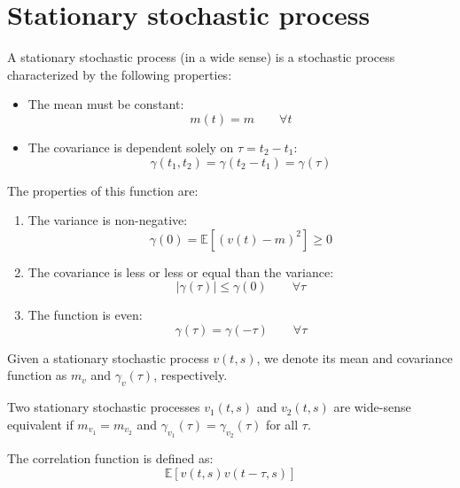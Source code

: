 \section{Stationary stochastic process}

\begin{definition}
    A stationary stochastic process (in a wide sense) is a stochastic process characterized by the following properties:
    \begin{itemize}
        \item The mean must be constant: 
            \[m(t)=m\qquad\forall t\]
        \item The covariance is dependent solely on $\tau=t_2-t_1$: 
            \[\gamma(t_1,t_2)=\gamma(t_2-t_1)=\gamma(\tau)\]
    \end{itemize}
\end{definition}
\noindent The properties of this function are:
\begin{enumerate}
    \item The variance is non-negative: 
        \[\gamma(0)=\mathbb{E}\left[{\left(v(t)-m\right)}^2\right]\geq 0\]
    \item The covariance is less or less or equal than the variance: 
        \[\left\lvert \gamma(\tau) \right\rvert \leq \gamma(0) \qquad \forall\tau\]
    \item The function is even: 
        \[\gamma(\tau)=\gamma(-\tau) \qquad\forall\tau\]
\end{enumerate}

\begin{property}
    Given a stationary stochastic process $v(t,s)$, we denote its mean and covariance function as $m_v$ and $\gamma_v(\tau)$, respectively.
\end{property}
\begin{property}
    Two stationary stochastic processes $v_1(t,s)$ and $v_2(t,s)$ are wide-sense equivalent if $m_{v_1}=m_{v_2}$ and $\gamma_{v_1}(\tau)=\gamma_{v_2}(\tau)$ for all $\tau$.
\end{property}
\begin{definition}
    The correlation function is defined as: 
    \[\mathbb{E}\left[ v(t,s)v(t-\tau,s) \right]\]
\end{definition}


